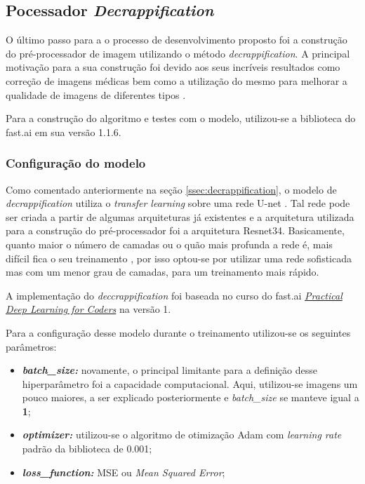 \subsection{Pocessador \textit{Decrappification}}

O último passo para a o processo de desenvolvimento proposto foi a construção do pré-processador de imagem utilizando o método \textit{decrappification}. A principal motivação para a sua construção foi devido aos seus incríveis resultados como correção de imagens médicas bem como a utilização do mesmo para melhorar a qualidade de imagens de diferentes tipos \cite{f8-decrappification}.

Para a construção do algoritmo e testes com o modelo, utilizou-se a biblioteca do fast.ai em sua versão 1.1.6.

\subsubsection{Configuração do modelo}

Como comentado anteriormente na seção \ref{ssec:decrappification}, o modelo de \textit{decrappification} utiliza o \textit{transfer learning} sobre uma rede U-net \cite{u-net}. Tal rede pode ser criada a partir de algumas arquiteturas já existentes e a arquitetura utilizada para a construção do pré-processador foi a arquitetura Resnet34. Basicamente, quanto maior o número de camadas ou o quão mais profunda a rede é, mais difícil fica o seu treinamento \cite{deep-resnet-for-image-recognition}, por isso optou-se por utilizar uma rede sofisticada mas com um menor grau de camadas, para um treinamento mais rápido.

A implementação do \textit{deccrappification} foi baseada no curso do fast.ai \href{https://course.fast.ai/}\textit{Practical Deep Learning for Coders} na versão 1.

Para a configuração desse modelo durante o treinamento utilizou-se os seguintes parâmetros:

\begin{itemize}
  \item \textit{\textbf{batch\_size:}} novamente, o principal limitante para a definição desse hiperparâmetro foi a capacidade computacional. Aqui, utilizou-se imagens um pouco maiores, a ser explicado posteriormente e \textit{batch\_size} se manteve igual a \textbf{1};
  \item \textbf{\textit{optimizer:}} utilizou-se o algoritmo de otimização Adam com \textit{learning rate} padrão da biblioteca de 0.001;
  \item \textit{\textbf{loss\_function:}} MSE ou \textit{Mean Squared Error};
\end{itemize}

